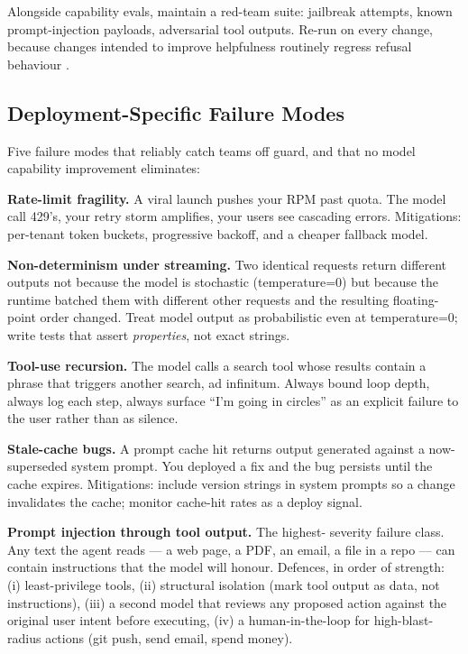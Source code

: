 Alongside capability evals, maintain a red-team suite: jailbreak
attempts, known prompt-injection payloads, adversarial tool
outputs. Re-run on every change, because changes intended to
improve helpfulness routinely regress refusal behaviour
\citep{wei2023jailbroken, zou2023universal}.

\subsection{Deployment-Specific Failure Modes}
\label{sec:wk11_failure_modes}

Five failure modes that reliably catch teams off guard, and that
no model capability improvement eliminates:

\textbf{Rate-limit fragility.} A viral launch pushes your RPM
past quota. The model call 429's, your retry storm amplifies,
your users see cascading errors. Mitigations: per-tenant token
buckets, progressive backoff, and a cheaper fallback model.

\textbf{Non-determinism under streaming.} Two identical requests
return different outputs not because the model is stochastic
(temperature=0) but because the runtime batched them with
different other requests and the resulting floating-point order
changed. Treat model output as probabilistic even at
temperature=0; write tests that assert \emph{properties}, not
exact strings.

\textbf{Tool-use recursion.} The model calls a search tool whose
results contain a phrase that triggers another search, ad
infinitum. Always bound loop depth, always log each step, always
surface ``I'm going in circles'' as an explicit failure to the
user rather than as silence.

\textbf{Stale-cache bugs.} A prompt cache hit returns output
generated against a now-superseded system prompt. You deployed a
fix and the bug persists until the cache expires. Mitigations:
include version strings in system prompts so a change
invalidates the cache; monitor cache-hit rates as a deploy
signal.

\textbf{Prompt injection through tool output.} The highest-
severity failure class. Any text the agent reads --- a web page,
a PDF, an email, a file in a repo --- can contain instructions
that the model will honour. Defences, in order of strength:
(i) least-privilege tools, (ii) structural isolation (mark tool
output as data, not instructions), (iii) a second model that
reviews any proposed action against the original user intent
before executing, (iv) a human-in-the-loop for high-blast-radius
actions (git push, send email, spend money).

